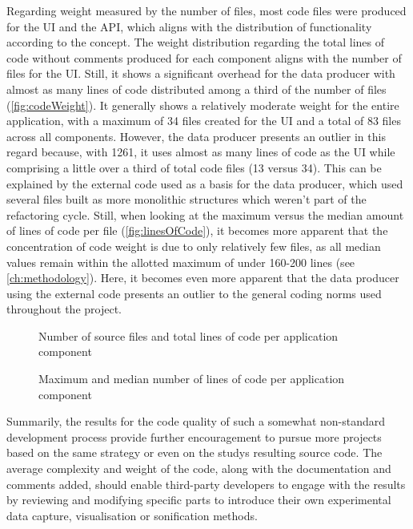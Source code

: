 Regarding weight measured by the number of files, most code files were produced for the \ac{UI} and the \ac{API}, which aligns with the distribution of functionality according to the concept.
The weight distribution regarding the total lines of code without comments produced for each component aligns with the number of files for the \ac{UI}.
Still, it shows a significant overhead for the data producer with almost as many lines of code distributed among a third of the number of files (\autoref{fig:codeWeight}).
It generally shows a relatively moderate weight for the entire application, with a maximum of 34 files created for the \ac{UI} and a total of 83 files across all components.
However, the data producer presents an outlier in this regard because, with 1261, it uses almost as many lines of code as the  \ac{UI} while comprising a little over a third of total code files (13 versus 34).
This can be explained by the external code used as a basis for the data producer, which used several files built as more monolithic structures which weren't part of the refactoring cycle.
Still, when looking at the maximum versus the median amount of lines of code per file (\autoref{fig:linesOfCode}), it becomes more apparent that the concentration of code weight is due to only relatively few files, as all median values remain within the allotted maximum of under 160-200 lines (see \autoref{ch:methodology}).
Here, it becomes even more apparent that the data producer using the external code presents an outlier to the general coding norms used throughout the project.

\begin{figure*}[!ht]
\hfill

\caption[Source file count and total lines of code]{Number of source files and total lines of code per application component\protect}
\label{fig:codeWeight}
\end{figure*}

\begin{figure}[!ht]
\centering

\caption[Lines of code]{Maximum and median number of lines of code per application component\protect}
\label{fig:linesOfCode}
\end{figure}

Summarily, the results for the code quality of such a somewhat non-standard development process provide further encouragement to pursue more projects based on the same strategy or even on the study\textquotesingle s resulting source code.
The average complexity and weight of the code, along with the documentation and comments added, should enable third-party developers to engage with the results by reviewing and modifying specific parts to introduce their own experimental data capture, visualisation or sonification methods.

